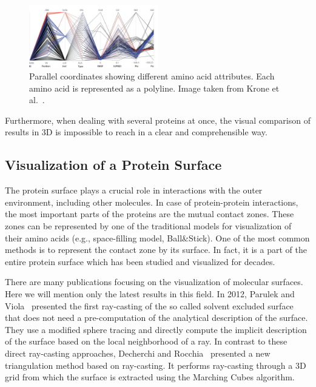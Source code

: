 \documentclass[11pt,a4paper,titlepage,oneside,onecolumn]{article}
\begin{document}
\begin{figure}[t]
  \centering
  \includegraphics[width=0.5\textwidth]{pics/parallel.png}
  \caption{Parallel coordinates showing different amino acid attributes. Each amino acid is represented as a polyline. Image taken from Krone et al.~\cite{Krone2014}.}
  \label{fig:parallel}
\end{figure}

Furthermore, when dealing with several proteins at once, the visual comparison of results in 3D is impossible to reach in a clear and comprehensible way.  

\subsection{Visualization of a Protein Surface}
The protein surface plays a crucial role in interactions with the outer environment, including other molecules. 
In case of protein-protein interactions, the most important parts of the proteins are the mutual contact zones. 
These zones can be represented by one of the traditional models for visualization of their amino acids (e.g., space-filling model, Ball\&Stick). 
One of the most common methods is to represent the contact zone by its surface. 
In fact, it is a part of the entire protein surface which has been studied and visualized for decades.

There are many publications focusing on the visualization of molecular surfaces.
Here we will mention only the latest results in this field.
In 2012, Parulek and Viola~\cite{ParulekViola2012} presented the first ray-casting of the so called solvent excluded surface that does not need a pre-computation of the analytical description of the surface.
They use a modified sphere tracing and directly compute the implicit description of the surface based on the local neighborhood of a ray.   
In contrast to these direct ray-casting approaches, Decherchi and Rocchia~\cite{Decherchi2013} presented a new triangulation method based on ray-casting. 
It performs ray-casting through a 3D grid from which the surface is extracted using the Marching Cubes algorithm. 

\end{document}
